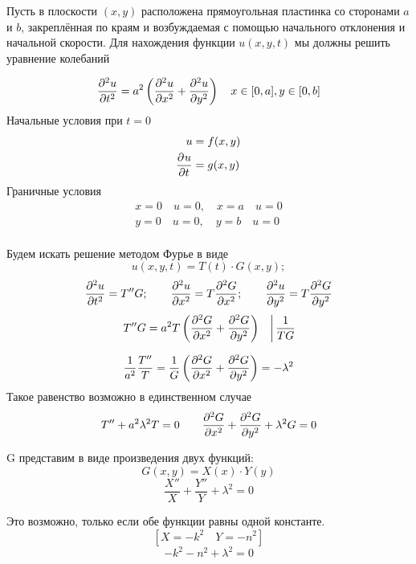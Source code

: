 	Пусть в плоскости $(x, y)$ расположена прямоугольная пластинка со сторонами $a$ и $b$, закреплённая по краям и возбуждаемая с помощью начального отклонения и начальной скорости. Для нахождения функции $u(x, y, t)$ мы должны решить уравнение колебаний

	\[
		\frac{\partial^{2}u}{\partial t^{2}} = a^2 \left(\frac{\partial^{2}u}{\partial x^{2}} + \frac{\partial^{2}u}{\partial y^{2}} \right)\quad x\in [0,a], y \in [0, b]
	\]
	Начальные условия при $t = 0$
	\begin{alignat*}{1}
		u&=f(x,y) \\
		\frac{\partial^{}u}{\partial t^{}} &= g(x,y)
	\end{alignat*}
	Граничные условия
	\begin{align*}
		x=0 \quad u=0, \quad x = a \quad u = 0\\
		y=0 \quad u=0, \quad y = b \quad u = 0\\
	\end{align*}

	Будем искать решение методом Фурье в виде
	\[
		u(x,y,t) = T(t) \cdot G(x,y);
	\]
	\[
	\frac{\partial^{2}u}{\partial t^{2}} = T''  G; \qquad \frac{\partial^{2}u}{\partial x^{2}}  = T \frac{\partial^{2}G}{\partial x^{2}}; \qquad \frac{\partial^{2}u}{\partial y^{2}} = T\frac{\partial^{2}G}{\partial y^{2}}
	\]
	\[
		\left.  T''  G = a^2 T  \left(\frac{\partial^{2}G}{\partial x^{2}} + \frac{\partial^{2}G}{\partial y^{2}}\right) \quad \right| \frac{1}{TG}
	\]
	

	\[
		\frac{1}{a^2} \frac{T''}{T} = \frac{1}{G} \left(\frac{\partial^{2}G}{\partial x^{2}} + \frac{\partial^{2}G}{\partial y^{2}}\right) = - \lambda^2
	\]
		Такое равенство возможно в единственном случае\\
	\[
		T'' + a^2 \lambda^2 T = 0 \qquad \frac{\partial^{2}G}{\partial x^{2}} + \frac{\partial^{2}G}{\partial y^{2}} + \lambda^2 G = 0
	\]
	
	G представим в виде произведения двух функций:
	\[
		G(x,y) = X(x) \cdot Y(y)
	\]
	\[
		\frac{X''}{X} + \frac{Y''}{Y} + \lambda^2 = 0
	\]
	
	Это возможно, только если обе функции равны одной константе.
	\[
		[X = -k^2 \quad Y=-n^2]
	\]
	\[
		-k^2 -n^2 +\lambda^2 =0
	\]
	
